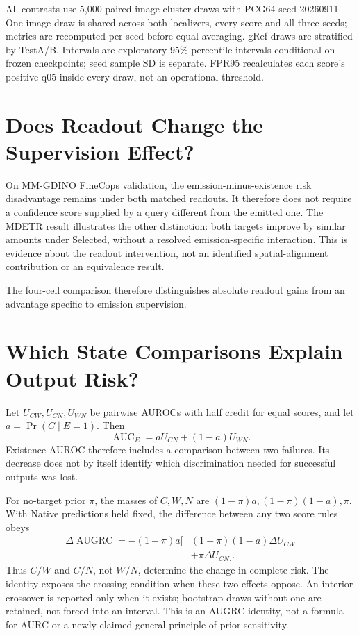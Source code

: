 \documentclass[10pt,twocolumn,letterpaper]{article}
\begin{document}
All contrasts use 5,000 paired image-cluster draws with PCG64 seed
20260911. One image draw is shared across both localizers, every score
and all three seeds; metrics are recomputed per seed before equal
averaging. gRef draws are stratified by TestA/B. Intervals are
exploratory 95\% percentile intervals conditional on frozen checkpoints;
seed sample SD is separate. FPR95 recalculates each score's positive
q05 inside every draw, not an operational threshold.



\section{Does Readout Change the Supervision Effect?}


On MM-GDINO FineCops validation, the emission-minus-existence risk disadvantage remains
under both matched readouts. It therefore does not require a confidence
score supplied by a query different from the emitted one. The MDETR
result illustrates the other distinction: both targets improve by
similar amounts under Selected, without a resolved emission-specific
interaction. This is evidence about the readout intervention, not an
identified spatial-alignment contribution or an equivalence result.

The four-cell comparison therefore distinguishes absolute readout gains
from an advantage specific to emission supervision.

\section{Which State Comparisons Explain Output Risk?}

Let $U_{CW},U_{CN},U_{WN}$ be pairwise AUROCs with half credit for
equal scores, and let $a=\Pr(C\mid E=1)$. Then
\begin{equation}
\operatorname{AUC}_E=aU_{CN}+(1-a)U_{WN}.
\end{equation}
Existence AUROC therefore includes a comparison between two failures.
Its decrease does not by itself identify which discrimination needed
for successful outputs was lost.

For no-target prior $\pi$, the masses of $C,W,N$ are
$(1-\pi)a,(1-\pi)(1-a),\pi$. With Native predictions held fixed, the
difference between any two score rules obeys
\begin{align}
\Delta\operatorname{AUGRC}
=-(1-\pi)a\big[&(1-\pi)(1-a)\Delta U_{CW}\nonumber\\
&+\pi\Delta U_{CN}\big].
\label{eq:state_risk}
\end{align}
Thus $C/W$ and $C/N$, not $W/N$, determine the change in complete
risk. The identity exposes the crossing condition when these two
effects oppose. An interior crossover is reported only when it exists;
bootstrap draws without one are retained, not forced into an interval.
This is an AUGRC identity, not a formula for AURC or a newly claimed
general principle of prior sensitivity.
\end{document}
